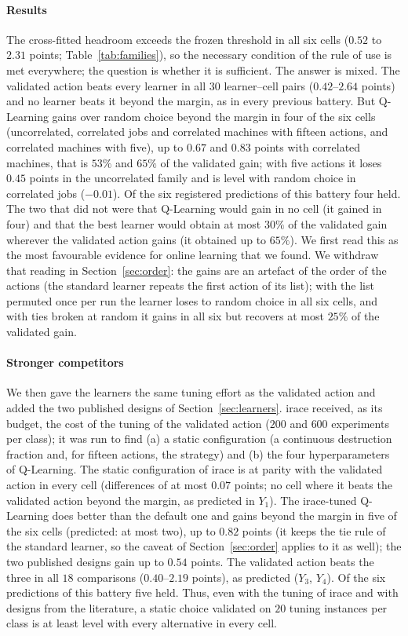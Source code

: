 \paragraph{Results} The cross-fitted headroom exceeds the frozen threshold in all six cells ($0.52$ to $2.31$ points; Table~\ref{tab:families}), so the necessary condition of the rule of use is met everywhere; the question is whether it is sufficient. The answer is mixed. The validated action beats every learner in all $30$ learner--cell pairs ($0.42$--$2.64$ points) and no learner beats it beyond the margin, as in every previous battery. But Q-Learning gains over random choice beyond the margin in four of the six cells (uncorrelated, correlated jobs and correlated machines with fifteen actions, and correlated machines with five), up to $0.67$ and $0.83$ points with correlated machines, that is $53\%$ and $65\%$ of the validated gain; with five actions it loses $0.45$ points in the uncorrelated family and is level with random choice in correlated jobs ($-0.01$). Of the six registered predictions of this battery four held. The two that did not were that Q-Learning would gain in no cell (it gained in four) and that the best learner would obtain at most $30\%$ of the validated gain wherever the validated action gains (it obtained up to $65\%$). We first read this as the most favourable evidence for online learning that we found. We withdraw that reading in Section~\ref{sec:order}: the gains are an artefact of the order of the actions (the standard learner repeats the first action of its list); with the list permuted once per run the learner loses to random choice in all six cells, and with ties broken at random it gains in all six but recovers at most $25\%$ of the validated gain.

\paragraph{Stronger competitors} We then gave the learners the same tuning effort as the validated action and added the two published designs of Section~\ref{sec:learners}. irace received, as its budget, the cost of the tuning of the validated action ($200$ and $600$ experiments per class); it was run to find (a) a static configuration (a continuous destruction fraction and, for fifteen actions, the strategy) and (b) the four hyperparameters of Q-Learning. The static configuration of irace is at parity with the validated action in every cell (differences of at most $0.07$ points; no cell where it beats the validated action beyond the margin, as predicted in $Y_1$). The irace-tuned Q-Learning does better than the default one and gains beyond the margin in five of the six cells (predicted: at most two), up to $0.82$ points (it keeps the tie rule of the standard learner, so the caveat of Section~\ref{sec:order} applies to it as well); the two published designs gain up to $0.54$ points. The validated action beats the three in all $18$ comparisons ($0.40$--$2.19$ points), as predicted ($Y_3$, $Y_4$). Of the six predictions of this battery five held. Thus, even with the tuning of irace and with designs from the literature, a static choice validated on $20$ tuning instances per class is at least level with every alternative in every cell.

